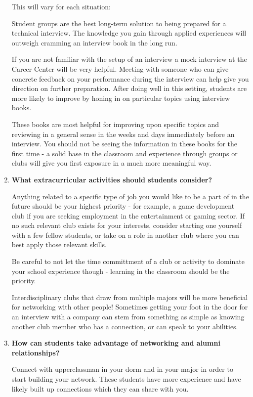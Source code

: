 \documentclass[11pt]{article}
\begin{document}
\begin{enumerate}
This will vary for each situation:

Student groups are the best long-term solution to being prepared for a
        technical interview.  The knowledge you gain through applied
        experiences will outweigh cramming an interview book in the long run.

If you are not familiar with the setup of an interview a mock interview at the
Career Center will be very helpful.  Meeting with someone who can give concrete
feedback on your performance during the interview can help give you direction
        on further preparation.  After doing well in this setting, students are
        more likely to improve by honing in on particular topics using
        interview books.

These books are most helpful for improving upon specific topics and reviewing
        in a general sense in the weeks and days immediately before an
        interview.  You should not be seeing the information in these books for
        the first time - a solid base in the classroom and experience through
        groups or clubs will give you first exposure in a much more meaningful
        way.

\item \textbf{What extracurricular activities should students consider?}

Anything related to a specific type of job you would like to be a part of in
the future should be your highest priority - for example, a game development
club if you are seeking employment in the entertainment or gaming sector.  If
no such relevant club exists for your interests, consider starting one yourself
with a few fellow students, or take on a role in another club where you can
best apply those relevant skills.

Be careful to not let the time committment of a club or activity to dominate
your school experience though - learning in the classroom should be the
priority.

Interdisciplinary clubs that draw from multiple majors will be more beneficial
for networking with other people!  Sometimes getting your foot in the door for
an interview with a company can stem from something as simple as knowing
another club member who has a connection, or can speak to your abilities.

\item \textbf{How can students take advantage of networking and alumni
    relationships?}

Connect with upperclassman in your dorm and in your major in order to start
building your network.  These students have more experience and have likely
built up connections which they can share with you.


\end{enumerate}
\end{document}
